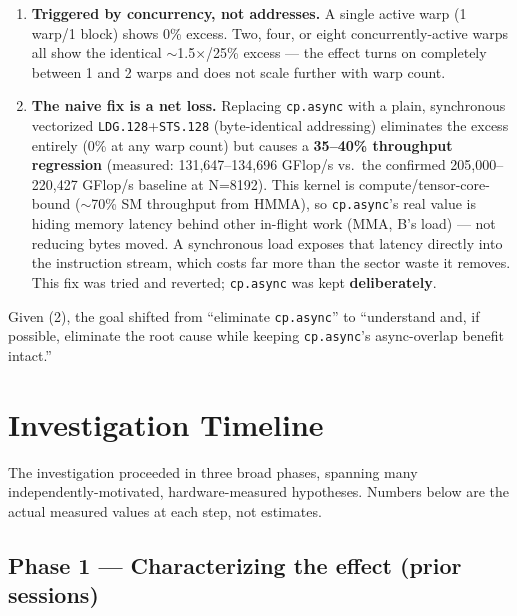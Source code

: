 \documentclass[11pt]{article}
\begin{document}
\begin{enumerate}
\item \textbf{Triggered by concurrency, not addresses.} A single active warp (1 warp/1 block) shows 0\% excess. Two, four, or eight concurrently-active warps all show the identical $\sim$1.5$\times$/25\% excess --- the effect turns on completely between 1 and 2 warps and does not scale further with warp count.
\item \textbf{The naive fix is a net loss.} Replacing \texttt{cp.async} with a plain, synchronous vectorized \texttt{LDG.128}+\texttt{STS.128} (byte-identical addressing) eliminates the excess entirely (0\% at any warp count) but causes a \textbf{35--40\% throughput regression} (measured: 131{,}647--134{,}696 GFlop/s vs.\ the confirmed 205{,}000--220{,}427 GFlop/s baseline at N=8192). This kernel is compute/tensor-core-bound ($\sim$70\% SM throughput from HMMA), so \texttt{cp.async}'s real value is hiding memory latency behind other in-flight work (MMA, B's load) --- not reducing bytes moved. A synchronous load exposes that latency directly into the instruction stream, which costs far more than the sector waste it removes. This fix was tried and reverted; \texttt{cp.async} was kept \textbf{deliberately}.
\end{enumerate}

Given (2), the goal shifted from ``eliminate \texttt{cp.async}'' to ``understand and, if possible, eliminate the root cause while keeping \texttt{cp.async}'s async-overlap benefit intact.''

\section{Investigation Timeline}

The investigation proceeded in three broad phases, spanning many independently-motivated, hardware-measured hypotheses. Numbers below are the actual measured values at each step, not estimates.

\subsection{Phase 1 --- Characterizing the effect (prior sessions)}
\end{document}
